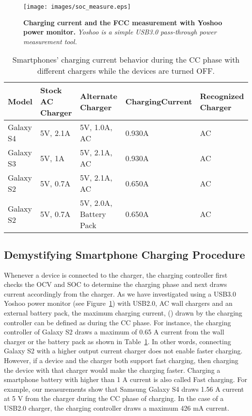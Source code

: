 \documentclass[journal]{IEEEtran}
\begin{document}
\begin{figure}[t]
  \begin{center}
  \texttt{[image: images/soc\_measure.eps]}
  
\caption{{\bf Charging current and the FCC measurement with Yoshoo power monitor. }{\sl Yoshoo is a simple USB3.0 pass-through power measurement tool.}}
\label{fig:soc_measure}
 \end{center}
 \end{figure}

\begin{table}[t]
\begin{center}
  \caption{Smartphones' charging current behavior during the CC phase with different chargers while the devices are turned OFF.}

\begin{tabular}{|p{15mm}|p{12mm}|p{15mm}|p{12mm}|p{10mm}|}
      \hline      
       Model&Stock AC Charger&Alternate Charger& Charging\break Current & Recognized Charger\\\hline
       Galaxy S4& 5V, 2.1A& 5V, 1.0A, AC& 0.930A& AC \\\hline
       Galaxy S3 & 5V, 1A & 5V, 2.1A, AC &0.930A& AC\\\hline
       Galaxy S2 & 5V, 0.7A & 5V, 2.1A, AC & 0.650A& AC\\\hline
       Galaxy S2 & 5V, 0.7A & 5V, 2.0A, Battery Pack &  0.650A& AC\\\hline

  \end{tabular}
\label{tab:rates_cap}
    \end{center}
 
\end{table}

\subsection{Demystifying Smartphone Charging Procedure}
\label{sub:chg_proc}
Whenever a device is connected to the charger, the charging controller first checks the OCV and SOC to determine the charging phase and next draws current accordingly from the charger. As we have investigated using a USB3.0 Yoshoo power monitor (see Figure~\ref{fig:soc_measure}) with USB2.0, AC wall chargers and an external battery pack, the maximum charging current, () drawn by the charging controller can be defined as  during the CC phase. For instance, the charging controller of Galaxy S2 draws a maximum of 0.65 A current from the wall charger or the battery pack as shown in Table~\ref{tab:rates_cap}. In other words, connecting Galaxy S2 with a higher output current charger does not enable faster charging. However, if a device and the charger both support fast charging, then charging the device with that charger would make the charging faster.  Charging a smartphone battery with higher than 1 A current is also called Fast charging. For example, our measurements show that Samsung Galaxy S4 draws 1.56 A current at 5 V from the charger during the CC phase of charging. In the case of a USB2.0 charger, the charging controller  draws a maximum 426 mA current. 
\end{document}
